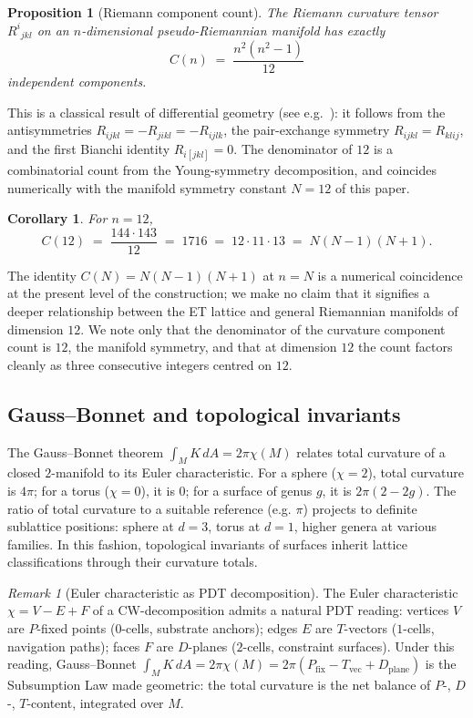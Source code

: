 \documentclass[11pt,a4paper]{article}
\newtheorem{corollary}[theorem]{Corollary}
\newtheorem{proposition}[theorem]{Proposition}
\theoremstyle{definition}
\theoremstyle{remark}
\newtheorem{remark}[theorem]{Remark}
\begin{document}
\begin{proposition}[Riemann component count]\label{prop:riemann}
The Riemann curvature tensor $R^{i}{}_{jkl}$ on an $n$-dimensional pseudo-Riemannian manifold has exactly
\[
C(n) \;=\; \frac{n^{2}(n^{2}-1)}{12}
\]
independent components.
\end{proposition}

This is a classical result of differential geometry (see e.g.~\cite{MTW}): it follows from the antisymmetries $R_{ijkl} = -R_{jikl} = -R_{ijlk}$, the pair-exchange symmetry $R_{ijkl} = R_{klij}$, and the first Bianchi identity $R_{i[jkl]} = 0$. The denominator of $12$ is a combinatorial count from the Young-symmetry decomposition, and coincides numerically with the manifold symmetry constant $N=12$ of this paper.

\begin{corollary}\label{cor:1716}
For $n=12$,
\[
C(12) \;=\; \frac{144\cdot 143}{12} \;=\; 1716 \;=\; 12\cdot 11\cdot 13 \;=\; N(N-1)(N+1).
\]
\end{corollary}

The identity $C(N) = N(N-1)(N+1)$ at $n=N$ is a numerical coincidence at the present level of the construction; we make no claim that it signifies a deeper relationship between the ET lattice and general Riemannian manifolds of dimension $12$. We note only that the denominator of the curvature component count is $12$, the manifold symmetry, and that at dimension $12$ the count factors cleanly as three consecutive integers centred on $12$.

\subsection{Gauss--Bonnet and topological invariants}

The Gauss--Bonnet theorem $\int_{M}K\,dA = 2\pi\chi(M)$ relates total curvature of a closed $2$-manifold to its Euler characteristic. For a sphere ($\chi=2$), total curvature is $4\pi$; for a torus ($\chi=0$), it is $0$; for a surface of genus $g$, it is $2\pi(2-2g)$. The ratio of total curvature to a suitable reference (e.g. $\pi$) projects to definite sublattice positions: sphere at $d=3$, torus at $d=1$, higher genera at various families. In this fashion, topological invariants of surfaces inherit lattice classifications through their curvature totals.

\begin{remark}[Euler characteristic as PDT decomposition]
The Euler characteristic $\chi = V - E + F$ of a CW-decomposition admits a natural PDT reading: vertices $V$ are $P$-fixed points ($0$-cells, substrate anchors); edges $E$ are $T$-vectors ($1$-cells, navigation paths); faces $F$ are $D$-planes ($2$-cells, constraint surfaces). Under this reading, Gauss--Bonnet $\int_{M} K\,dA = 2\pi\chi(M) = 2\pi(P_{\text{fix}} - T_{\text{vec}} + D_{\text{plane}})$ is the Subsumption Law made geometric: the total curvature is the net balance of $P$-, $D$-, $T$-content, integrated over $M$.
\end{remark}
\end{document}
